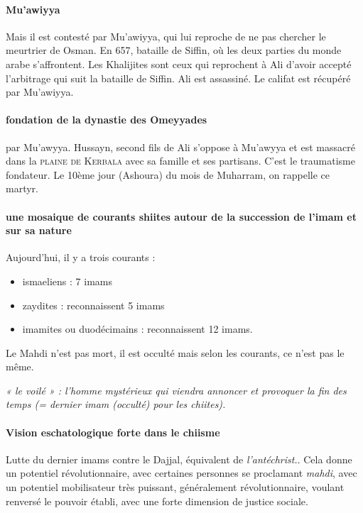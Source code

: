  \paragraph{Mu'awiyya }Mais il est contesté par Mu'awiyya, qui lui reproche de ne pas chercher le meurtrier de Osman. En 657, bataille de Siffin, où les deux parties du monde arabe s'affrontent. Les Khalijites sont ceux qui reprochent à Ali d'avoir accepté l'arbitrage qui suit la bataille de Siffin.
 Ali est assassiné. Le califat est récupéré par Mu'awiyya.
 
 \paragraph{fondation de la dynastie des Omeyyades} par Mu'awyya. Hussayn, second fils de Ali s'oppose à Mu'awyya et est massacré dans la \textsc{plaine de Kerbala} avec sa famille et ses partisans. C'est le traumatisme fondateur. Le 10ème jour (Ashoura) du mois de Muharram, on rappelle ce martyr.
 
 \paragraph{une mosaique de courants shiites autour de la succession de l'imam et sur sa nature}
 Aujourd'hui, il y a trois courants : 
 \begin{itemize}
     \item ismaeliens :  7 imams
     \item zaydites : reconnaissent 5 imams
     \item imamites ou duodécimains : reconnaissent 12 imams.
 \end{itemize}
 
 Le Mahdi n'est pas mort, il est occulté mais selon les courants, ce n'est pas le même. 
 
 \begin{Def}[mahdi]
   \emph{« le voilé » : l'homme mystérieux qui viendra annoncer et
provoquer la fin des temps (= dernier imam (occulté) pour les chiites).}
 \end{Def}
 
 \paragraph{Vision eschatologique forte dans le chiisme} Lutte du dernier imams contre le Dajjal, équivalent de \textit{l'antéchrist.}. Cela donne un potentiel révolutionnaire, avec certaines personnes se proclamant \textit{mahdi}, avec un potentiel mobilisateur très puissant, généralement révolutionnaire, voulant renversé le pouvoir établi, avec une forte dimension de justice sociale.
 
